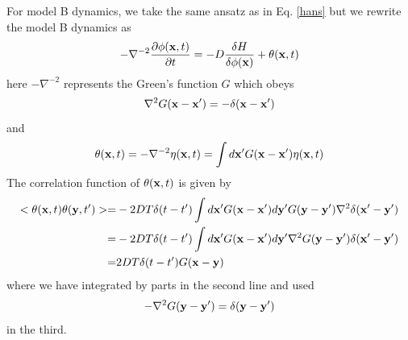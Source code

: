 For model B dynamics, we take the same ansatz as in Eq. \eqref{hans} but we rewrite the model B dynamics as
\begin{equation}
    -\nabla^{-2} \frac{\partial\phi({\bf x},t)}{\partial t} = -D \frac{\delta H}{\delta \phi({\bf x})}+  \theta({\bf x},t)
\end{equation}
here $-\nabla^{-2}$ represents the Green's function $G$ which obeys 
\begin{equation}
    \nabla^2 G({\bf x}-{\bf x'}) = -\delta({\bf x}-{\bf x}')
\end{equation}
and 
\begin{equation}
    \theta({\bf x},t)=-\nabla^{-2}\eta({\bf x},t)= \int d{\bf x}'G({\bf x}-{\bf x'})\eta({\bf x},t)
\end{equation}
The correlation function of $\theta({\bf x},t)$ is given by
\begin{align}
    < \theta({\bf x},t)\theta({\bf y},t')> =&-2DT\delta(t-t') \int d{\bf x}'G({\bf x}-{\bf x'})d{\bf y}'G({\bf y}-{\bf y'})\nabla^2\delta({\bf x}'-{\bf y}') \nonumber \\
=& -2DT\delta(t-t') \int d{\bf x}'G({\bf x}-{\bf x'})d{\bf y}'\nabla^2G({\bf y}-{\bf y'})\delta({\bf x}'-{\bf y}') \nonumber \\
=& 2DT\delta(t-t') G({\bf x}-{\bf y})
\end{align}
where we have integrated by parts in the second line and used 
\begin{equation}
    -\nabla^2G({\bf y}-{\bf y'})= \delta({\bf y}-{\bf y}')
\end{equation}
in the third.

